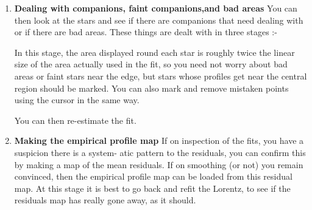 {{\begin{enumerate}
 \item {\bf Dealing with companions, faint companions,and bad areas}
   You can then look at the stars and see if there are companions that
   need dealing with or if there are bad areas. These things are dealt
   with in three stages :-

                                                                               
   In this stage, the area displayed round each star is roughly twice the
   linear size of the area actually used in the fit, so you need not
   worry about bad areas or faint stars near the edge, but stars whose
   profiles get near the central region should be marked.
   You can also mark and remove mistaken points using the cursor in the
   same way.

   You can then re-estimate the fit.
                                                                               
 \item {\bf Making the empirical profile map}
   If on inspection of the fits, you have a suspicion there is a system-
   atic pattern to the residuals, you can confirm this by making a map
   of the mean residuals. If on smoothing (or not) you remain convinced,
   then the empirical profile map can be loaded from this residual map.
   At this stage it is best to go back and refit the Lorentz, to see if
   the residuals map has really gone away, as it should.
                                                                               

\end{enumerate}}}
